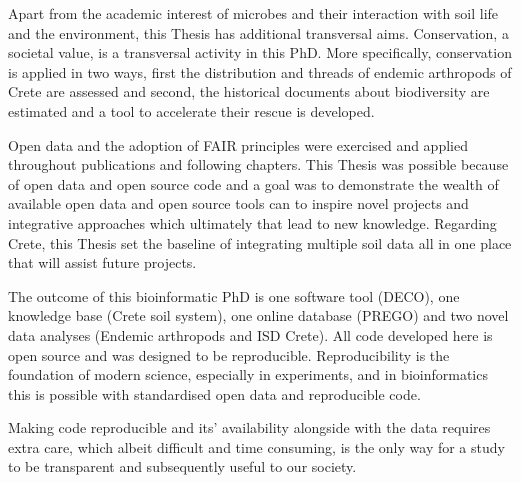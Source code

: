 Apart from the academic interest of microbes and their 
interaction with soil life and the environment, this Thesis 
has additional transversal aims. 
Conservation, a societal value, is a transversal activity 
in this PhD. More specifically, conservation is applied 
in two ways, first the distribution and threads of endemic arthropods of Crete are assessed 
and second, the historical documents about biodiversity are estimated and a tool to 
accelerate their rescue is developed. 

Open data and the adoption of FAIR principles 
were exercised and applied throughout publications and following chapters.
This Thesis was possible because of open data and open source code 
and a goal was to demonstrate
the wealth of available open data
and open source tools can to inspire novel projects and integrative approaches
which ultimately that lead to new knowledge.
Regarding Crete, this Thesis set the baseline of integrating 
multiple soil data all in one place that will assist future projects. 

The outcome of this bioinformatic PhD is one software tool (DECO),
one knowledge base (Crete soil system), one online database (PREGO) and
two novel data analyses (Endemic arthropods and ISD Crete).
All code developed here is open source and was designed to be reproducible. 
Reproducibility is the foundation of modern science, 
especially in experiments,
and in bioinformatics this is possible 
with standardised open data and reproducible code.

Making code reproducible and its' availability alongside with the data 
requires extra care, which albeit difficult and time consuming, 
is the only way for a study to be transparent and subsequently 
useful to our society.


